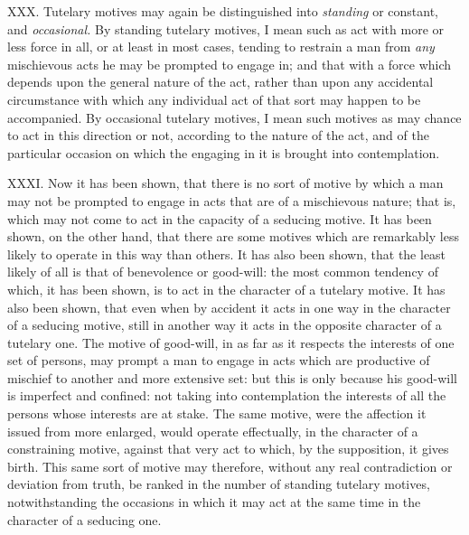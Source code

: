 \documentclass[12pt]{report}
\begin{document}
XXX. Tutelary motives may again be distinguished into \emph{standing} or
constant, and \emph{occasional.} By standing tutelary motives, I mean
such as act with more or less force in all, or at least in most cases,
tending to restrain a man from \emph{any} mischievous acts he may be
prompted to engage in; and that with a force which depends upon the
general nature of the act, rather than upon any accidental circumstance
with which any individual act of that sort may happen to be accompanied.
By occasional tutelary motives, I mean such motives as may chance to act
in this direction or not, according to the nature of the act, and of the
particular occasion on which the engaging in it is brought into
contemplation.

XXXI. Now it has been shown, that there is no sort of motive by which a
man may not be prompted to engage in acts that are of a mischievous
nature; that is, which may not come to act in the capacity of a seducing
motive. It has been shown, on the other hand, that there are some
motives which are remarkably less likely to operate in this way than
others. It has also been shown, that the least likely of all is that of
benevolence or good-will: the most common tendency of which, it has been
shown, is to act in the character of a tutelary motive. It has also been
shown, that even when by accident it acts in one way in the character of
a seducing motive, still in another way it acts in the opposite
character of a tutelary one. The motive of good-will, in as far as it
respects the interests of one set of persons, may prompt a man to engage
in acts which are productive of mischief to another and more extensive
set: but this is only because his good-will is imperfect and confined:
not taking into contemplation the interests of all the persons whose
interests are at stake. The same motive, were the affection it issued
from more enlarged, would operate effectually, in the character of a
constraining motive, against that very act to which, by the supposition,
it gives birth. This same sort of motive may therefore, without any real
contradiction or deviation from truth, be ranked in the number of
standing tutelary motives, notwithstanding the occasions in which it may
act at the same time in the character of a seducing one.
\end{document}
